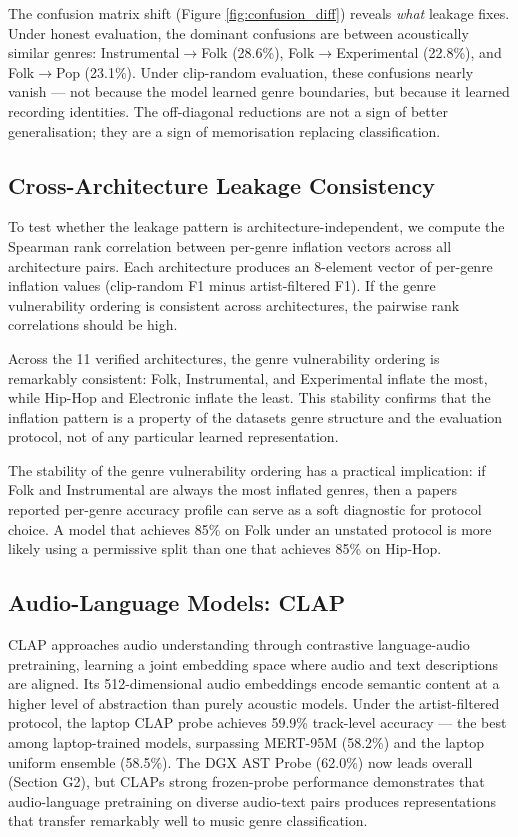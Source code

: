\documentclass[conference]{IEEEtran}
\begin{document}
The confusion matrix shift (Figure \ref{fig:confusion_diff}) reveals
\emph{what} leakage fixes. Under honest evaluation, the dominant
confusions are between acoustically similar genres:
Instrumental\(\rightarrow\)Folk (28.6\%),
Folk\(\rightarrow\)Experimental (22.8\%), and Folk\(\rightarrow\)Pop
(23.1\%). Under clip-random evaluation, these confusions nearly vanish
--- not because the model learned genre boundaries, but because it
learned recording identities. The off-diagonal reductions are not a sign
of better generalisation; they are a sign of memorisation replacing
classification.

\subsection{Cross-Architecture Leakage
Consistency}\label{e.-cross-architecture-leakage-consistency}

To test whether the leakage pattern is architecture-independent, we
compute the Spearman rank correlation between per-genre inflation
vectors across all architecture pairs. Each architecture produces an
8-element vector of per-genre inflation values (clip-random F1 minus
artist-filtered F1). If the genre vulnerability ordering is consistent
across architectures, the pairwise rank correlations should be high.

Across the 11 verified architectures, the genre vulnerability ordering
is remarkably consistent: Folk, Instrumental, and Experimental inflate
the most, while Hip-Hop and Electronic inflate the least. This stability
confirms that the inflation pattern is a property of the
dataset\textquotesingle s genre structure and the evaluation protocol,
not of any particular learned representation.

The stability of the genre vulnerability ordering has a practical
implication: if Folk and Instrumental are always the most inflated
genres, then a paper\textquotesingle s reported per-genre accuracy
profile can serve as a soft diagnostic for protocol choice. A model that
achieves 85\% on Folk under an unstated protocol is more likely using a
permissive split than one that achieves 85\% on Hip-Hop.

\subsection{Audio-Language Models:
CLAP}\label{f.-audio-language-models-clap}

CLAP \citep{wu2023clap} approaches audio understanding through
contrastive language-audio pretraining, learning a joint embedding space
where audio and text descriptions are aligned. Its 512-dimensional audio
embeddings encode semantic content at a higher level of abstraction than
purely acoustic models. Under the artist-filtered protocol, the laptop
CLAP probe achieves 59.9\% track-level accuracy --- the best among
laptop-trained models, surpassing MERT-95M (58.2\%) and the laptop
uniform ensemble (58.5\%). The DGX AST Probe (62.0\%) now leads overall
(Section G2), but CLAP\textquotesingle s strong frozen-probe performance
demonstrates that audio-language pretraining on diverse audio-text pairs
produces representations that transfer remarkably well to music genre
classification.
\end{document}
